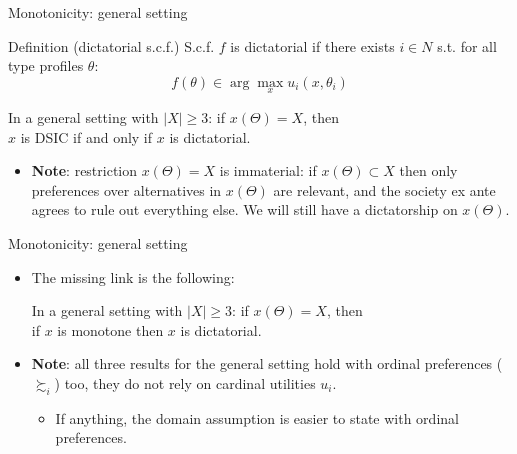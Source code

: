 \documentclass[english,10pt
,aspectratio=169
]{beamer}
\begin{document}
\begin{frame}{Monotonicity: general setting}
	\begin{exampleblock}{Definition (dictatorial s.c.f.)}
		S.c.f. $f$ is \alert{dictatorial} if there exists $i \in N$ s.t. for all type profiles $\theta$:
		$$ f(\theta) \in \arg \max_x u_i(x,\theta_i)$$
	\end{exampleblock}
	\begin{theorem}
		In a general setting with $|X|\geq 3$: if $x(\Theta)=X$, then\\
		\centering
		$x$ is \alert{DSIC} if and only if $x$ is \alert{dictatorial}.
	\end{theorem}
	\begin{itemize}
		\item \textbf{Note}: restriction $x(\Theta)=X$ is immaterial: if $x(\Theta) \subset X$ then only preferences over alternatives in $x(\Theta)$ are relevant, and the society ex ante agrees to rule out everything else. We will still have a dictatorship on $x(\Theta)$.
	\end{itemize}
\end{frame}


\begin{frame}{Monotonicity: general setting}
	\begin{itemize}
		\item The missing link is the following:
		\begin{theorem}
			In a general setting with $|X|\geq 3$: if $x(\Theta)=X$, then\\
			\centering
			if $x$ is monotone then $x$ is dictatorial.
		\end{theorem}
		\item \textbf{Note}: all three results for the general setting hold with ordinal preferences ($\succsim_i$) too, they do not rely on cardinal utilities $u_i$.
		\begin{itemize}
			\item If anything, the domain assumption is easier to state with ordinal preferences.
		\end{itemize}
	\end{itemize}
\end{frame}
\end{document}
